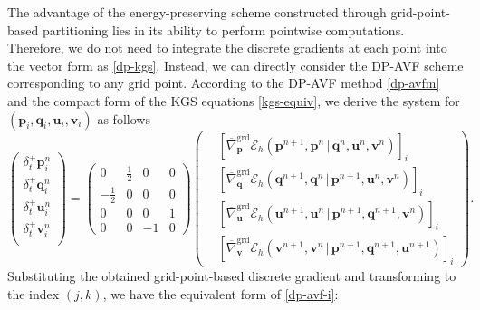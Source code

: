 \documentclass[fleqn,11pt]{elsarticle}
\numberwithin{equation}{section}
\begin{document}
The advantage of the energy-preserving scheme constructed through grid-point-based partitioning lies in its ability to perform pointwise computations. Therefore, we do not need to integrate the discrete gradients at each point into the vector form as \eqref{dp-kgs}. Instead, we can directly consider the DP-AVF scheme corresponding to any grid point. According to the DP-AVF method \eqref{dp-avfm} and the compact form of the KGS equations \eqref{kgs-equiv}, we derive the system for $(\bm p_i, \bm q_i, \bm u_i, \bm v_i)$ as follows
\begin{equation}\label{dp-avf-i}
	\left(\begin{aligned}
			\delta_t^+\bm p_i^n \\
			\delta_t^+\bm q_i^n \\
			\delta_t^+\bm u_i^n \\
			\delta_t^+\bm v_i^n \\
		\end{aligned}\right)=
	\begin{pmatrix}
		0            & \frac{1}{2} & 0  & 0 \\
		-\frac{1}{2} & 0           & 0  & 0 \\
		0            & 0           & 0  & 1 \\
		0            & 0           & -1 & 0
	\end{pmatrix}\left(\begin{aligned}
			 & \left[\overline{\nabla}^{\text{grd}}_{\bm p}\mathcal{E}_h(\bm p^{n+1},\bm p^{n}\,\big|\, \bm q^n,\bm u^n,\bm v^n)\right]_{i}             \\
			 & \left[\overline{\nabla}^{\text{grd}}_{\bm q}\mathcal{E}_h(\bm q^{n+1},\bm q^{n}\,\big|\, \bm p^{n+1},\bm u^n,\bm v^n)\right]_{i}         \\
			 & \left[\overline{\nabla}^{\text{grd}}_{\bm u}\mathcal{E}_h(\bm u^{n+1},\bm u^{n}\,\big|\, \bm p^{n+1},\bm q^{n+1},\bm v^n)\right]_{i}     \\
			 & \left[\overline{\nabla}^{\text{grd}}_{\bm v}\mathcal{E}_h(\bm v^{n+1},\bm v^{n}\,\big|\,\bm p^{n+1},\bm q^{n+1},\bm u^{n+1})\right]_{i}
		\end{aligned}\right).
\end{equation}
Substituting the obtained grid-point-based discrete gradient and transforming to the index $(j,k)$, we have the equivalent form of \eqref{dp-avf-i}:
\end{document}

